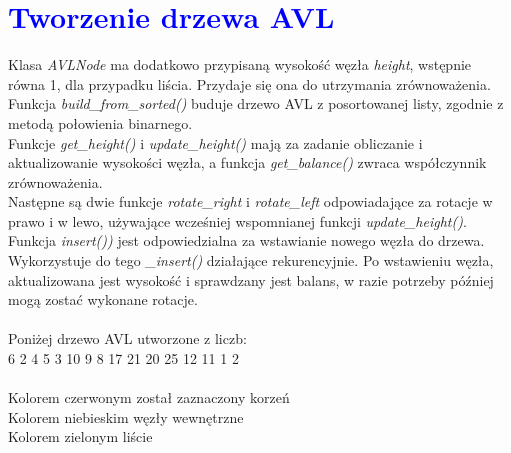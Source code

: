 \documentclass{article}
\begin{document}
	\newpage
	
	\section*{\textcolor{blue}{Tworzenie drzewa AVL}}
	\begin{multicols}{2}
		\noindent Klasa \textit{AVLNode} ma dodatkowo przypisaną wysokość węzła \textit{height}, wstępnie równa 1, dla przypadku liścia. Przydaje się ona do utrzymania zrównoważenia. \\Funkcja \textit{build\_from\_sorted()} buduje drzewo AVL z posortowanej listy, zgodnie z metodą połowienia binarnego. \\Funkcje \textit{get\_height()} i \textit{update\_height()} mają za zadanie obliczanie i aktualizowanie wysokości węzła, a funkcja \textit{get\_balance()} zwraca współczynnik zrównoważenia. \\Następne są dwie funkcje \textit{rotate\_right} i \textit{rotate\_left} odpowiadające za rotacje w prawo i w lewo, używające wcześniej wspomnianej funkcji \textit{update\_height()}. Funkcja \textit{insert())} jest odpowiedzialna za wstawianie nowego węzła do drzewa. Wykorzystuje do tego \textit{\_insert()} działające rekurencyjnie. Po wstawieniu węzła, aktualizowana jest wysokość i sprawdzany jest balans, w razie potrzeby później mogą zostać wykonane rotacje.\\ \\
		\noindent Poniżej drzewo AVL utworzone z liczb: \\6 2 4 5 3 10 9 8 17 21 20 25 12 11 1 2 \\ \\ 
		\noindent Kolorem czerwonym został zaznaczony korzeń \\
		Kolorem niebieskim węzły wewnętrzne \\
		Kolorem zielonym liście
			
		\vspace*{1cm}
		
		

\end{multicols}
\end{document}
